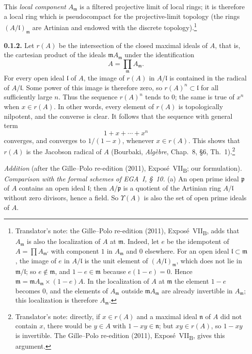 This \emph{local component} \(A_{\mathfrak m}\) is a filtered
projective limit of local rings; it is therefore a local ring which is
pseudocompact for the projective-limit topology (the rings
\((A/\mathfrak l)_{\mathfrak m}\) are Artinian and endowed with the discrete
topology).\footnote{Translator's note: the Gille--Polo re-edition (2011), Expos\'e~VII\textsubscript{B},
adds that \(A_{\mathfrak m}\) is also the localization of \(A\) at \(\mathfrak m\). Indeed, let \(e\) be the
idempotent of \(A=\prod A_{\mathfrak m'}\) with component \(1\) in \(A_{\mathfrak m}\) and \(0\) elsewhere.
For an open ideal \(\mathfrak l\subset\mathfrak m\), the image of \(e\) in \(A/\mathfrak l\) is the unit
element of \((A/\mathfrak l)_{\mathfrak m}\), which does not lie in \(\mathfrak m/\mathfrak l\); so
\(e\notin\mathfrak m\), and \(1-e\in\mathfrak m\) because \(e(1-e)=0\). Hence
\(\mathfrak m=\mathfrak mA_{\mathfrak m}\times(1-e)A\). In the localization of \(A\) at \(\mathfrak m\) the
element \(1-e\) becomes \(0\), and the elements of \(A_{\mathfrak m}\) outside \(\mathfrak mA_{\mathfrak m}\)
are already invertible in \(A_{\mathfrak m}\); this localization is therefore \(A_{\mathfrak m}\).}

\medskip
\noindent\textbf{0.1.2.}
\label{sga3:VIIB:0.1.2}
Let \(r(A)\) be the intersection of the closed maximal ideals of \(A\),
that is, the cartesian product of the ideals
\(\mathfrak mA_{\mathfrak m}\) under the identification
\[
  A=\prod_{\mathfrak m}A_{\mathfrak m}.
\]
For every open ideal \(\mathfrak l\) of \(A\), the image of \(r(A)\) in
\(A/\mathfrak l\) is contained in the radical of \(A/\mathfrak l\).
Some power of this image is therefore zero, so
\(r(A)^n\subset\mathfrak l\) for all sufficiently large \(n\). Thus the
sequence \(r(A)^n\) tends to \(0\); the same is true of \(x^n\) when
\(x\in r(A)\). In other words, every
element of \(r(A)\) is topologically nilpotent, and the converse is
clear. It follows that the sequence with general term
\[
  1+x+\cdots+x^n
\]
converges, and converges to \(1/(1-x)\), whenever \(x\in r(A)\). This
shows that \(r(A)\) is the Jacobson radical of \(A\) (Bourbaki,
\emph{Alg\`ebre}, Chap.~8, \S6, Th.~1).\footnote{Translator's note: directly, if \(x\in r(A)\)
and a maximal ideal \(\mathfrak n\) of \(A\) did not contain \(x\), there would be \(y\in A\) with
\(1-xy\in\mathfrak n\); but \(xy\in r(A)\), so \(1-xy\) is invertible. The Gille--Polo re-edition (2011),
Expos\'e~VII\textsubscript{B}, gives this argument.}

\medskip\noindent
\emph{Addition} (after the Gille--Polo re-edition (2011), Expos\'e~VII\textsubscript{B}; our formulation).
\emph{Comparison with the formal schemes of EGA~I, \S~10.} (a) An open prime ideal \(\mathfrak p\) of \(A\)
contains an open ideal \(\mathfrak l\); then \(A/\mathfrak p\) is a quotient of the Artinian ring
\(A/\mathfrak l\) without zero divisors, hence a field. So \(\Upsilon(A)\) is also the set of open prime
ideals of \(A\).

